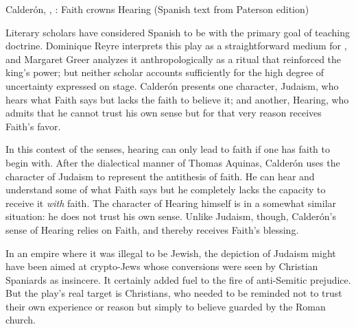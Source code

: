 
\begin{poemexample}
    \caption{Calderón, , : Faith
    crowns Hearing (Spanish text from Paterson edition)}
    \label{poem:Calderon-Retiro-Hearing}
\end{poemexample}

Literary scholars have considered Spanish  to be
 with the primary goal of teaching
doctrine.%
    \Autocite{Wardropper:TeatroReligioso}
Dominique Reyre interprets this play as a straightforward medium for
, and Margaret Greer analyzes it
anthropologically as a ritual that reinforced the king's power; but neither
scholar accounts sufficiently for the high degree of uncertainty expressed on
stage.%
    \Autocites
    {Reyre:Retiro}
    {Greer:Retiro}
Calderón presents one character, Judaism, who hears what Faith says but lacks
the faith to believe it; and another, Hearing, who admits that he cannot trust
his own sense but for that very reason receives Faith's favor.

In this contest of the senses, hearing can only lead to faith if one has
faith to begin with.
After the dialectical manner of Thomas Aquinas, Calderón uses the character of
Judaism to represent the antithesis of faith.
He can hear and understand some of what Faith says but he completely lacks the
capacity to receive it \emph{with} faith.
The character of Hearing himself is in a somewhat similar situation: he does
not trust his own sense.
Unlike Judaism, though, Calderón's sense of Hearing relies on Faith, and
thereby receives Faith's blessing.


In an empire where it was illegal to be Jewish, the depiction of Judaism might
have been aimed at crypto-Jews whose conversions were seen by Christian
Spaniards as insincere. 
It certainly added fuel to the fire of anti-Semitic prejudice.
But the play's real target is Christians, who needed to be reminded not to
trust their own experience or reason but simply to believe 
guarded by the Roman church.

